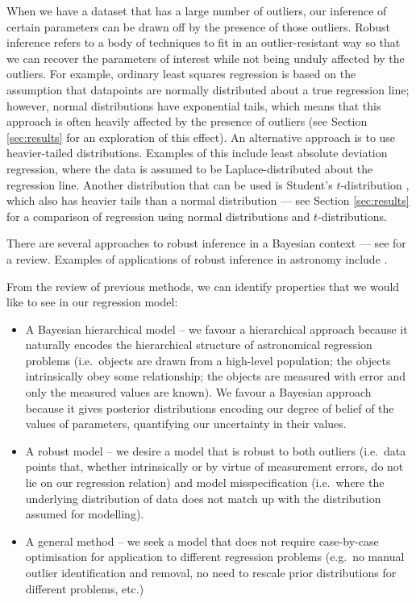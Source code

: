 \documentclass[fleqn,usenatbib]{mnras}
\begin{document}
When we have a dataset that has a large number of outliers, our inference of
certain parameters can be drawn off by the presence of those outliers. Robust
inference refers to a body of techniques to fit in an outlier-resistant way so
that we can recover the parameters of interest while not being unduly affected
by the outliers.  For example, ordinary least squares regression is based on the
assumption that datapoints are normally distributed about a true regression
line; however, normal distributions have exponential tails, which means that
this approach is often heavily affected by the presence of outliers (see Section
\ref{sec:results} for an exploration of this effect). An alternative approach is
to use heavier-tailed distributions.  Examples of this include least absolute
deviation regression, where the data is assumed to be Laplace-distributed about
the regression line.  Another distribution that can be used is Student's
$t$-distribution \citep[e.g.][]{Berger:1994, Gelman:2013}, which also has
heavier tails than a normal distribution --- see Section \ref{sec:results} for a
comparison of regression using normal distributions and $t$-distributions.

There are several approaches to robust inference in a Bayesian context
--- see \citet{Berger:1994} for a review. Examples of applications of robust
inference in astronomy include \citet{Park:2017, Feeney:2018}.

From the review of previous methods, we can identify properties that we would
like to see in our regression model:

\begin{itemize}
	\item A Bayesian hierarchical model -- we favour a hierarchical approach
	because it naturally encodes the hierarchical structure of astronomical
	regression problems (i.e.\ objects are drawn from a high-level population;
	the objects intrinsically obey some relationship; the objects are measured
	with error and only the measured values are known). We favour a Bayesian
	approach because it gives posterior distributions encoding our degree of
	belief of the values of parameters, quantifying our uncertainty in their
	values.

	\item A robust model -- we desire a model that is robust to both outliers
	(i.e.\ data points that, whether intrinsically or by virtue of measurement
	errors, do not lie on our regression relation) and model misspecification
	(i.e.\ where the underlying distribution of data does not match up with the
	distribution assumed for modelling).

	\item A general method -- we seek a model that does not require case-by-case
	optimisation for application to different regression problems (e.g.\ no
	manual outlier identification and removal, no need to rescale prior
	distributions for different problems, etc.)
\end{itemize}
\end{document}

